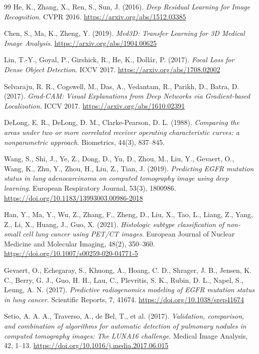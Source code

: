 \documentclass[11pt, a4paper]{article}
\begin{document}
\begin{thebibliography}{99}
He, K., Zhang, X., Ren, S., Sun, J. (2016).
\textit{Deep Residual Learning for Image Recognition}.
CVPR 2016. \url{https://arxiv.org/abs/1512.03385}

Chen, S., Ma, K., Zheng, Y. (2019).
\textit{Med3D: Transfer Learning for 3D Medical Image Analysis}.
\url{https://arxiv.org/abs/1904.00625}

Lin, T.-Y., Goyal, P., Girshick, R., He, K., Dollár, P. (2017).
\textit{Focal Loss for Dense Object Detection}.
ICCV 2017. \url{https://arxiv.org/abs/1708.02002}

Selvaraju, R. R., Cogswell, M., Das, A., Vedantam, R., Parikh, D., Batra, D. (2017).
\textit{Grad-CAM: Visual Explanations from Deep Networks via Gradient-based Localization}.
ICCV 2017. \url{https://arxiv.org/abs/1610.02391}

DeLong, E. R., DeLong, D. M., Clarke-Pearson, D. L. (1988).
\textit{Comparing the areas under two or more correlated receiver operating characteristic curves: a nonparametric approach}.
Biometrics, 44(3), 837--845.

Wang, S., Shi, J., Ye, Z., Dong, D., Yu, D., Zhou, M., Liu, Y., Gevaert, O., Wang, K., Zhu, Y., Zhou, H., Liu, Z., Tian, J. (2019).
\textit{Predicting EGFR mutation status in lung adenocarcinoma on computed tomography image using deep learning}.
European Respiratory Journal, 53(3), 1800986. \url{https://doi.org/10.1183/13993003.00986-2018}

Han, Y., Ma, Y., Wu, Z., Zhang, F., Zheng, D., Liu, X., Tao, L., Liang, Z., Yang, Z., Li, X., Huang, J., Guo, X. (2021).
\textit{Histologic subtype classification of non-small cell lung cancer using PET/CT images}.
European Journal of Nuclear Medicine and Molecular Imaging, 48(2), 350--360. \url{https://doi.org/10.1007/s00259-020-04771-5}

Gevaert, O., Echegaray, S., Khuong, A., Hoang, C. D., Shrager, J. B., Jensen, K. C., Berry, G. J., Guo, H. H., Lau, C., Plevritis, S. K., Rubin, D. L., Napel, S., Leung, A. N. (2017).
\textit{Predictive radiogenomics modeling of EGFR mutation status in lung cancer}.
Scientific Reports, 7, 41674. \url{https://doi.org/10.1038/srep41674}

Setio, A. A. A., Traverso, A., de Bel, T., et al. (2017).
\textit{Validation, comparison, and combination of algorithms for automatic detection of pulmonary nodules in computed tomography images: The LUNA16 challenge}.
Medical Image Analysis, 42, 1--13. \url{https://doi.org/10.1016/j.media.2017.06.015}

\end{thebibliography}
\end{document}
